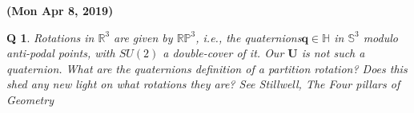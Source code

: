 \documentclass[twocolumn,aps,sort,nofootinbib]{revtex4}
\newtheorem{question}{Q}
\newcommand{\link}[2][url]{\href{#2}{#1}}
\begin{document}
\textbf{(Mon Apr 8, 2019)}
\begin{question}
	Rotations in $\mathbb{R}^3$ are given by $\mathbb{R}\mathbb{P}^3$, i.e., the quaternions\footnotemark $\boldsymbol{q}\in\mathbb{H}$ in $\mathbb{S}^3$ modulo anti-podal points,
	with $SU(2)$ a double-cover of it.
	Our $\boldsymbol{U}$ is not such a quaternion. What are the quaternions definition of a partition rotation? Does this shed any new light on what rotations they are?
	See Stillwell, \textit{The Four pillars of Geometry}
\end{question}
\end{document}
